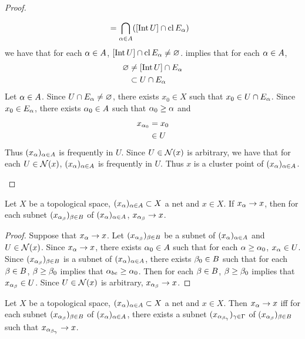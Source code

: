 \documentclass{book}
\begin{document}
\begin{proof}
\begin{itemize}
\begin{align*}
				& = \bigcap\limits_{\alpha \in A} ([\operatorname{Int} U] \cap \operatorname{cl} E_{\alpha} )
			\end{align*}
			we have that for each $\alpha \in A$, $[\operatorname{Int} U] \cap \operatorname{cl} E_{\alpha} \neq \varnothing$.  implies that for each $\alpha \in A$,
			\begin{align*}
				\varnothing 
				& \neq [\operatorname{Int} U] \cap E_{\alpha} \\
				& \subset U \cap E_{\alpha}
			\end{align*} 
			Let $\alpha \in A$. Since $U \cap E_{\alpha} \neq \varnothing$, there exists $x_0 \in X$ such that $x_0 \in U \cap E_{\alpha}$. Since $x_0 \in E_{\alpha}$, there exists $\alpha_0 \in A$ such that $\alpha_0 \geq \alpha$ and 
			\begin{align*}
				x_{\alpha_0} 
				& = x_0 \\
				& \in U
			\end{align*}
			Thus $(x_{\alpha})_{\alpha \in A}$ is frequently in $U$. Since $U \in \mathcal{N}(x)$ is arbitrary, we have that for each $U \in \mathcal{N}(x)$, $(x_{\alpha})_{\alpha \in A}$ is frequently in $U$. Thus $x$ is a cluster point of $(x_{\alpha})_{\alpha \in A}$.
		\end{itemize}
	\end{proof}
	
	\begin{ex} 
		Let $X$ be a topological space, $(x_{\alpha})_{\alpha \in A} \subset X$ a net and $x \in X$. If $x_{\alpha} \rightarrow x$, then for each subnet $(x_{\alpha_{\beta}})_{\beta \in B}$ of $(x_{\alpha})_{\alpha \in A}$, $x_{\alpha_{\beta}} \rightarrow x$.
	\end{ex}

	\begin{proof}
		Suppose that $x_{\alpha} \rightarrow x$. Let $(x_{\alpha_{\beta}})_{\beta \in B}$ be a subnet of $(x_{\alpha})_{\alpha \in A}$ and $U \in \mathcal{N}(x)$. Since $x_{\alpha} \rightarrow x$, there exists $\alpha_0 \in A$ such that for each $\alpha \geq \alpha_0$, $x_{\alpha} \in U$. Since $(x_{\alpha_{\beta}})_{\beta \in B}$ is a subnet of $(x_{\alpha})_{\alpha \in A}$, there exists $\beta_0 \in B$ such that for each $\beta \in B$, $\beta \geq \beta_0$ implies that $\alpha_{be} \geq \alpha_0$. Then for each $\beta \in B$, $\beta \geq \beta_0$ implies that $x_{\alpha_{\beta}} \in U$. Since $U \in \mathcal{N}(x)$ is arbitrary, $x_{\alpha_{\beta}} \rightarrow x$.
	\end{proof}
	
	\begin{ex}
		Let $X$ be a topological space, $(x_{\alpha})_{\alpha \in A} \subset X$ a net and $x \in X$. Then $x_{\alpha} \rightarrow x$ iff for each subnet $(x_{\alpha_{\beta}})_{\beta \in B}$ of $(x_{\alpha})_{\alpha \in A}$, there exists a subnet $(x_{\alpha_{\beta_{\gamma}}})_{\gamma \in \Gamma}$ of $(x_{\alpha_{\beta}})_{\beta \in B}$ such that $x_{\alpha_{\beta_{\gamma}}} \rightarrow x$.  
	\end{ex}
\end{document}
